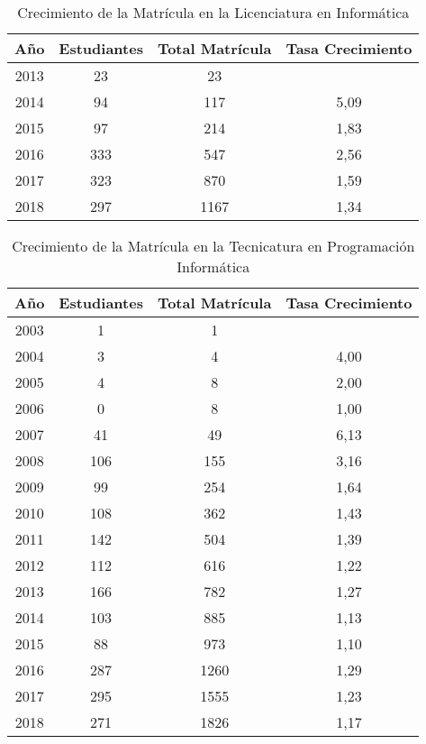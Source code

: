 \begin{table}[!htbp]
    \centering
    \begin{tabular}{|c|c|c|c|}
    \hline
    Año & Estudiantes & Total Matrícula & Tasa Crecimiento \\
    \hline
    2013 & 23 & 23 & \\
    \hline
    2014 & 94 & 117 & 5,09 \\ 
    \hline
    2015 & 97 & 214 & 1,83 \\
    \hline
    2016 & 333 & 547 & 2,56 \\
    \hline
    2017 & 323 & 870 & 1,59 \\ 
    \hline
    2018 & 297 & 1167 & 1,34 \\ 
    \hline
    \end{tabular}
    \caption{Crecimiento de la Matrícula en la Licenciatura en Informática}
    \label{tab:crecimiento_matricula_lids}
\end{table}



\begin{table}[!htbp]
    \centering
    \begin{tabular}{|c|c|c|c|}
    \hline
    Año & Estudiantes & Total Matrícula & Tasa Crecimiento \\
    \hline
    2003 & 1 & 1 & \\
    \hline
    2004 & 3 & 4 & 4,00 \\
    \hline
    2005 & 4 & 8 & 2,00 \\
    \hline
    2006 & 0 & 8 & 1,00 \\
    \hline
    2007 & 41 & 49 & 6,13 \\
    \hline
    2008 & 106 & 155 & 3,16 \\
    \hline
    2009 & 99 & 254 & 1,64 \\
    \hline
    2010 & 108 & 362 & 1,43 \\
    \hline
    2011 & 142 & 504 & 1,39 \\ 
    \hline
    2012 & 112 & 616 & 1,22 \\
    \hline
    2013 & 166 & 782 & 1,27 \\
    \hline
    2014 & 103 & 885 & 1,13 \\
    \hline
    2015 & 88 & 973 & 1,10 \\
    \hline
    2016 & 287 & 1260 & 1,29 \\
    \hline
    2017 & 295 & 1555 & 1,23 \\
    \hline
    2018 & 271 & 1826 & 1,17 \\
    \hline
    \end{tabular}
    \caption{Crecimiento de la Matrícula en la Tecnicatura en Programación Informática}
    \label{tab:crecimiento_matricula_tpi}
\end{table}

